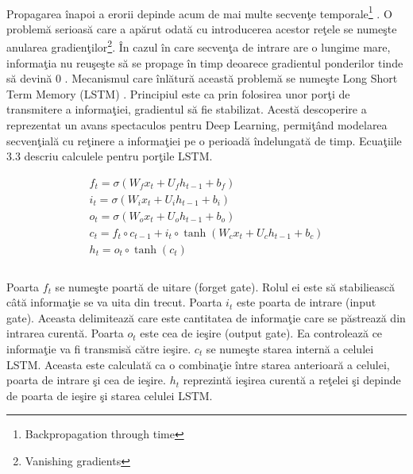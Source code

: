 \paragraph{}
Propagarea \^ inapoi a erorii depinde acum de mai multe secven\c te temporale\footnote{Backpropagation through time} \cite{Mozer:1995:FBA:201784.201791}. O problem\u a serioas\u a care a ap\u arut odat\u a cu introducerea acestor re\c tele se nume\c ste anularea gradien\c tilor\footnote{Vanishing gradients}. \^ In cazul \^ in care secven\c ta de intrare are o lungime mare, informa\c tia nu reu\c se\c ste s\u a se propage \^ in timp deoarece gradientul ponderilor tinde s\u a devin\u a \(0\) \cite{Hochreiter:1998:VGP:353515.355233}. Mecanismul care \^ inl\u atur\u a aceast\u a problem\u a se nume\c ste Long Short Term Memory (LSTM) \cite{Hochreiter:1997:LSM:1246443.1246450}. Principiul este ca prin folosirea unor por\c ti de transmitere a informa\c tiei, gradientul s\u a fie stabilizat. Acest\u a descoperire a reprezentat un avans spectaculos pentru Deep Learning, permi\c t\^ and modelarea secven\c tial\u a cu re\c tinere a informa\c tiei pe o perioad\u a \^ indelungat\u a de timp. Ecua\c tiile 3.3 descriu calculele pentru por\c tile LSTM.

\begin{equation}
\begin{split}
f_{t} = \sigma(W_{f}x_{t} + U_{f}h_{t-1} + b_{f})\\
i_{t} = \sigma(W_{i}x_{t} + U_{i}h_{t-1} + b_{i})\\
o_{t} = \sigma(W_{o}x_{t} + U_{o}h_{t-1} + b_{o})\\
c_{t} = f_{t} \circ c_{t-1} + i_{t} \circ \tanh (W_{c}x_{t} + U_{c}h_{t-1} + b_{c})\\
h_{t} = o_{t} \circ \tanh (c_{t})\\
\end{split}
\end{equation}

\paragraph{}
Poarta \(f_{t}\) se nume\c ste poart\u a de uitare (forget gate). Rolul ei este s\u a stabilieasc\u a c\^ at\u a informa\c tie se va uita din trecut. Poarta \(i_{t}\) este poarta de intrare (input gate). Aceasta delimiteaz\u a care este cantitatea de informa\c tie care se p\u astreaz\u a din intrarea curent\u a. Poarta \(o_{t}\) este cea de ie\c sire (output gate). Ea controleaz\u a ce informa\c tie va fi transmis\u a c\u atre ie\c sire. \(c_{t}\) se nume\c ste starea intern\u a a celulei LSTM. Aceasta este calculat\u a ca o combina\c tie \^ intre starea anterioar\u a a celulei, poarta de intrare \c si cea de ie\c sire. \(h_{t}\) reprezint\u a ie\c sirea curent\u a a re\c telei \c si depinde de poarta de ie\c sire \c si starea celulei LSTM.

